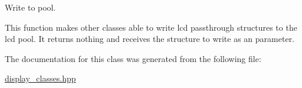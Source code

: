 Write to pool. 

This function makes other classes able to write lcd passthrough structures to the lcd pool. It returns nothing and receives the structure to write as an parameter. 

The documentation for this class was generated from the following file\+:\begin{DoxyCompactItemize}
\item 
\hyperlink{display__classes_8hpp}{display\+\_\+classes.\+hpp}\end{DoxyCompactItemize}

